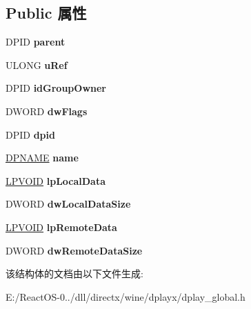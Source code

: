 \subsection*{Public 属性}
\begin{DoxyCompactItemize}
\item 
\mbox{\label{struct_group_data_a49839a3f9436cbad8cbbb795882b1981}} 
D\+P\+ID {\bfseries parent}
\item 
\mbox{\label{struct_group_data_ad0eef56778165b805f71fc8c38a14525}} 
U\+L\+O\+NG {\bfseries u\+Ref}
\item 
\mbox{\label{struct_group_data_a7de41a197bf68f4f082e38b1bdd1b301}} 
D\+P\+ID {\bfseries id\+Group\+Owner}
\item 
\mbox{\label{struct_group_data_a9e68d3152ab9f418cb590ae41d6e2779}} 
D\+W\+O\+RD {\bfseries dw\+Flags}
\item 
\mbox{\label{struct_group_data_a090ff94e24fe1bdbdf22f1e202402b60}} 
D\+P\+ID {\bfseries dpid}
\item 
\mbox{\label{struct_group_data_a24490114277550b166a2e16e35972a29}} 
\hyperlink{structtag_d_p_n_a_m_e}{D\+P\+N\+A\+ME} {\bfseries name}
\item 
\mbox{\label{struct_group_data_adec12d958f05d1a85c2e89d2104633bf}} 
\hyperlink{interfacevoid}{L\+P\+V\+O\+ID} {\bfseries lp\+Local\+Data}
\item 
\mbox{\label{struct_group_data_a4bbeadf0167c9a2ea7c1573c9104ab88}} 
D\+W\+O\+RD {\bfseries dw\+Local\+Data\+Size}
\item 
\mbox{\label{struct_group_data_a724b405ffe0328118d64602b176fe2e2}} 
\hyperlink{interfacevoid}{L\+P\+V\+O\+ID} {\bfseries lp\+Remote\+Data}
\item 
\mbox{\label{struct_group_data_a69a93f3d37362716939a973a577c032b}} 
D\+W\+O\+RD {\bfseries dw\+Remote\+Data\+Size}
\end{DoxyCompactItemize}


该结构体的文档由以下文件生成\+:\begin{DoxyCompactItemize}
\item 
E\+:/\+React\+O\+S-\/0../dll/directx/wine/dplayx/dplay\+\_\+global.\+h\end{DoxyCompactItemize}
